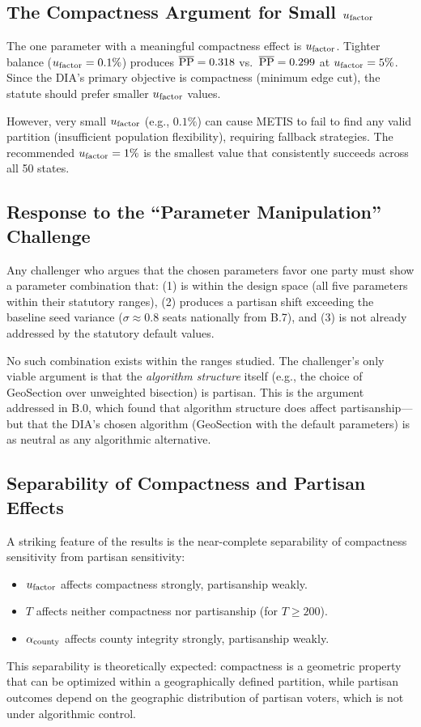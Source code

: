 \subsection{The Compactness Argument for Small $u_{\mathrm{factor}}$}

The one parameter with a meaningful compactness effect is $u_{\mathrm{factor}}$.
Tighter balance ($u_{\mathrm{factor}} = 0.1\%$) produces $\overline{\mathrm{PP}} = 0.318$
vs.\ $\overline{\mathrm{PP}} = 0.299$ at $u_{\mathrm{factor}} = 5\%$.
Since the DIA's primary objective is compactness (minimum edge cut), the
statute should prefer smaller $u_{\mathrm{factor}}$ values.

However, very small $u_{\mathrm{factor}}$ (e.g., $0.1\%$) can cause METIS to fail
to find any valid partition (insufficient population flexibility), requiring
fallback strategies.
The recommended $u_{\mathrm{factor}} = 1\%$ is the smallest value that consistently
succeeds across all 50 states.

\subsection{Response to the ``Parameter Manipulation'' Challenge}

Any challenger who argues that the chosen parameters favor one party must
show a parameter combination that:
(1) is within the design space (all five parameters within their statutory ranges),
(2) produces a partisan shift exceeding the baseline seed variance ($\sigma \approx 0.8$ seats nationally from B.7), and
(3) is not already addressed by the statutory default values.

No such combination exists within the ranges studied.
The challenger's only viable argument is that the \emph{algorithm structure}
itself (e.g., the choice of GeoSection over unweighted bisection) is partisan.
This is the argument addressed in B.0, which found that algorithm structure
does affect partisanship---but that the DIA's chosen algorithm (GeoSection
with the default parameters) is as neutral as any algorithmic alternative.

\subsection{Separability of Compactness and Partisan Effects}

A striking feature of the results is the near-complete separability of
compactness sensitivity from partisan sensitivity:
\begin{itemize}
\item $u_{\mathrm{factor}}$ affects compactness strongly, partisanship weakly.
\item $T$ affects neither compactness nor partisanship (for $T \geq 200$).
\item $\alpha_{\mathrm{county}}$ affects county integrity strongly, partisanship weakly.
\end{itemize}

This separability is theoretically expected: compactness is a geometric
property that can be optimized within a geographically defined partition,
while partisan outcomes depend on the geographic distribution of partisan
voters, which is not under algorithmic control.
